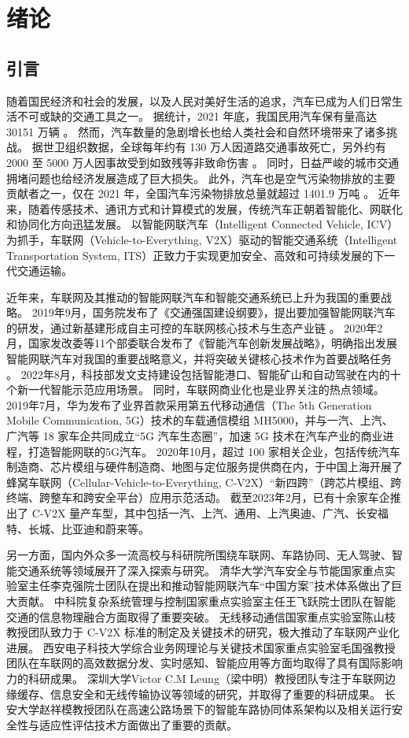 \chapter{绪论}
\section{引言}\label{section 1-1}

随着国民经济和社会的发展，以及人民对美好生活的追求，汽车已成为人们日常生活不可或缺的交通工具之一。
据统计，2021 年底，我国民用汽车保有量高达 30151 万辆 \cite{gou2022zhong}。
然而，汽车数量的急剧增长也给人类社会和自然环境带来了诸多挑战。
据世卫组织数据，全球每年约有 130 万人因道路交通事故死亡，另外约有 2000 至 5000 万人因事故受到如致残等非致命伤害 \cite{shi2022dao}。
同时，日益严峻的城市交通拥堵问题也给经济发展造成了巨大损失。
此外，汽车也是空气污染物排放的主要贡献者之一，仅在 2021 年，全国汽车污染物排放总量就超过 1401.9 万吨 \cite{shen2022zhong}。
近年来，随着传感技术、通讯方式和计算模式的发展，传统汽车正朝着智能化、网联化和协同化方向迅猛发展。
以智能网联汽车（Intelligent Connected Vehicle, ICV）为抓手，车联网（Vehicle-to-Everything, V2X）驱动的智能交通系统（Intelligent Transportation System, ITS）正致力于实现更加安全、高效和可持续发展的下一代交通运输。

近年来，车联网及其推动的智能网联汽车和智能交通系统已上升为我国的重要战略。
2019年9月，国务院发布了《交通强国建设纲要》，提出要加强智能网联汽车的研发，通过新基建形成自主可控的车联网核心技术与生态产业链 \cite{zhong2019jiao}。
2020年2月，国家发改委等11个部委联合发布了《智能汽车创新发展战略》，明确指出发展智能网联汽车对我国的重要战略意义，并将突破关键核心技术作为首要战略任务 \cite{guo2020zi}。
2022年8月，科技部发文支持建设包括智能港口、智能矿山和自动驾驶在内的十个新一代智能示范应用场景\cite{ke2022ke}。
同时，车联网商业化也是业界关注的热点领域。
2019年7月，华为发布了业界首款采用第五代移动通信（The 5th Generation Mobile Communication, 5G）技术的车载通信模组 MH5000，并与一汽、上汽、广汽等 18 家车企共同成立“5G 汽车生态圈”，加速 5G 技术在汽车产业的商业进程，打造智能网联的5G汽车。
2020年10月，超过 100 家相关企业，包括传统汽车制造商、芯片模组与硬件制造商、地图与定位服务提供商在内，于中国上海开展了蜂窝车联网（Cellular-Vehicle-to-Everything, C-V2X）“新四跨”（跨芯片模组、跨终端、跨整车和跨安全平台）应用示范活动。
截至2023年2月，已有十余家车企推出了 C-V2X 量产车型，其中包括一汽、上汽、通用、上汽奥迪、广汽、长安福特、长城、比亚迪和蔚来等。

另一方面，国内外众多一流高校与科研院所围绕车联网、车路协同、无人驾驶、智能交通系统等领域展开了深入探索与研究。
清华大学汽车安全与节能国家重点实验室主任李克强院士团队在提出和推动智能网联汽车“中国方案”技术体系做出了巨大贡献。
中科院复杂系统管理与控制国家重点实验室主任王飞跃院士团队在智能交通的信息物理融合方面取得了重要突破。
无线移动通信国家重点实验室陈山枝教授团队致力于 C-V2X 标准的制定及关键技术的研究，极大推动了车联网产业化进展。
西安电子科技大学综合业务网理论与关键技术国家重点实验室毛国强教授团队在车联网的高效数据分发、实时感知、智能应用等方面均取得了具有国际影响力的科研成果。
深圳大学Victor C.M Leung（梁中明）教授团队专注于车联网边缘缓存、信息安全和无线传输协议等领域的研究，并取得了重要的科研成果。
长安大学赵祥模教授团队在高速公路场景下的智能车路协同体系架构以及相关运行安全性与适应性评估技术方面做出了重要的贡献。


